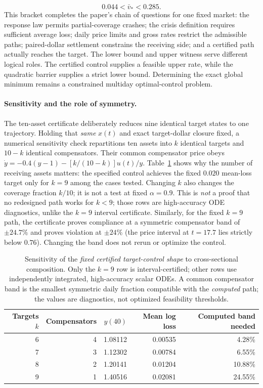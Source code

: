 \documentclass[review,hidelinks,onefignum,onetabnum]{siamonline250211}
\begin{document}
\begin{equation}\label{eq:v7-rate-bracket}
\boxed{\qquad 0.044<\bar v_*<0.285.\qquad}
\end{equation}
This bracket completes the paper's chain of questions for one fixed market: the response law permits partial-coverage crashes; the crisis definition requires sufficient average loss; daily price limits and gross rates restrict the admissible paths; paired-dollar settlement constrains the receiving side; and a certified path actually reaches the target. The lower bound and upper witness serve different logical roles. The certified control supplies a feasible upper rate, while the quadratic barrier supplies a strict lower bound. Determining the exact global minimum remains a constrained multiday optimal-control problem.
\paragraph{Sensitivity and the role of symmetry.}
The ten-asset certificate deliberately reduces nine identical target states to one trajectory. Holding that \emph{same} $x(t)$ and exact target-dollar closure fixed, a numerical sensitivity check repartitions ten assets into $k$ identical targets and $10-k$ identical compensators. Their common compensator price obeys $\dot y=-0.4(y-1)-[k/(10-k)]u(t)/y$. Table~\ref{tab:sensitivity} shows why the number of receiving assets matters: the specified control achieves the fixed $0.020$ mean-loss target only for $k=9$ among the cases tested. Changing $k$ also changes the coverage fraction $k/10$; it is not a test at fixed $\alpha=0.9$. This is \emph{not} a proof that no redesigned path works for $k<9$; those rows are high-accuracy ODE diagnostics, unlike the $k=9$ interval certificate. Similarly, for the fixed $k=9$ path, the certificate proves compliance at a symmetric compensator band of $\pm24.7\%$ and proves violation at $\pm24\%$ (the price interval at $t=17.7$ lies strictly below $0.76$). Changing the band does not rerun or optimize the control.
\begin{table}[H]\centering\small
\caption{Sensitivity of the \emph{fixed certified target-control shape} to cross-sectional composition. Only the $k=9$ row is interval-certified; other rows use independently integrated, high-accuracy scalar ODEs. A common compensator band is the smallest symmetric daily fraction compatible with the \emph{computed} path; the values are diagnostics, not optimized feasibility thresholds.}\label{tab:sensitivity}
\begin{tabular}{@{}rrrrr@{}}\toprule
Targets $k$ & Compensators & $y(40)$ & Mean log loss & Computed band needed \\\midrule
6 & 4 & 1.08112 & 0.00535 & 4.28\%\\
7 & 3 & 1.12302 & 0.00784 & 6.55\%\\
8 & 2 & 1.20141 & 0.01204 & 10.88\%\\
9 & 1 & 1.40516 & 0.02081 & 24.55\%\\
\bottomrule\end{tabular}
\end{table}
\end{document}
